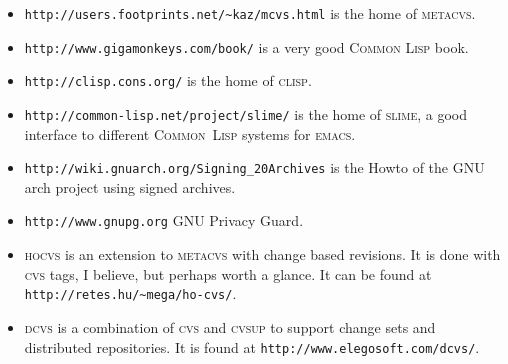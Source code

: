 \documentclass[fleqn, 10pt, a4paper]{article}
\begin{document}
\begin{itemize}
\item \texttt{http://users.footprints.net/\textasciitilde{}kaz/mcvs.html} is the home of
\textsc{metacvs}.
\item \texttt{http://www.gigamonkeys.com/book/} is a very good
\textsc{Common Lisp} book.
\item \texttt{http://clisp.cons.org/} is the home of \textsc{clisp}.
\item \texttt{http://common-lisp.net/project/slime/} is the home of
\textsc{slime}, a good interface to different \textsc{Common~Lisp}
systems for \textsc{emacs}.
\item \texttt{http://wiki.gnuarch.org/Signing\_20Archives} is the Howto of the
GNU arch project using signed archives.
\item \texttt{http://www.gnupg.org} GNU Privacy Guard.
\item \textsc{hocvs} is an extension to \textsc{metacvs} with change based
revisions. It is done with \textsc{cvs} tags, I believe, but perhaps worth a
glance. It can be found at \texttt{http://retes.hu/\textasciitilde{}mega/ho-cvs/}.
\item \textsc{dcvs} is a combination of \textsc{cvs} and \textsc{cvsup}
to support change sets and distributed repositories. It is found
at \texttt{http://www.elegosoft.com/dcvs/}.
\end{itemize}
\end{document}
